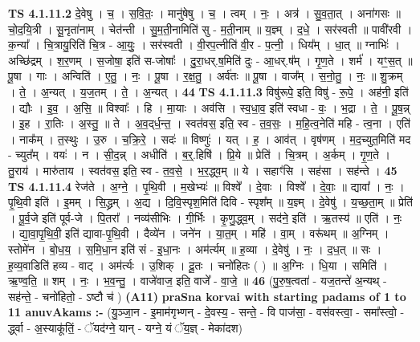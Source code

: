 \documentclass[17pt]{extarticle}
\begin{document}
                  \newline
                                \textbf{ TS 4.1.11.2} \newline
                  दे॒वेषु । च॒ । स॒वि॒तः॒ । मानु॑षेषु । च॒ । त्वम् । नः॒ । अत्र॑ । सु॒व॒ता॒त् । अना॑गसः ॥ चो॒द॒यि॒त्री । सू॒नृता॑नाम् । चेत॑न्ती । सु॒म॒ती॒नामिति॑ सु - म॒ती॒नाम् ॥ य॒ज्ञ्म् । द॒धे॒ । सर॑स्वती ॥ पावी॑रवी । क॒न्या᳚ । चि॒त्रायु॒रिति॑ चि॒त्र - आ॒युः॒ । सर॑स्वती । वी॒रप॒त्नीति॑ वी॒र - प॒त्नी॒ । धिय᳚म् । धा॒त् ॥ ग्नाभिः॑ । अच्छि॑द्रम् । श॒र॒णम् । स॒जोषा॒ इति॑ स-जोषाः᳚ । दु॒रा॒धर्.ष॒मिति॑ दुः - आ॒धर्.ष᳚म् । गृ॒ण॒ते । शर्म॑ । यꣳ॒॒स॒त् ॥ पू॒षा । गाः । अन्विति॑ । ए॒तु॒ । नः॒ । पू॒षा । र॒क्ष॒तु॒ । अर्व॑तः ॥ पू॒षा । वाज᳚म् । स॒नो॒तु॒ । नः॒ ॥ शु॒क्रम् । ते॒ । अ॒न्यत् । य॒ज॒तम् । ते॒ । अ॒न्यत् । \textbf{  44} \newline
                  \newline
                                \textbf{ TS 4.1.11.3} \newline
                  विषु॑रूपे॒ इति॒ विषु॑ - रू॒पे॒ । अह॑नी॒ इति॑ । द्यौः । इ॒व॒ । अ॒सि॒ ॥ विश्वाः᳚ । हि । मा॒याः । अव॑सि । स्व॒धा॒व॒ इति॑ स्वधा - वः॒ । भ॒द्रा । ते॒ । पू॒ष॒न्न् । इ॒ह । रा॒तिः । अ॒स्तु॒ ॥ ते । अ॒व॒द्‌र्ध॒न्त॒ । स्वत॑वस॒ इति॒ स्व - त॒व॒सः॒ । म॒हि॒त्व॒नेति॑ महि - त्व॒ना । एति॑ । नाक᳚म् । त॒स्थुः । उ॒रु । च॒क्रि॒रे॒ । सदः॑ ॥ विष्णुः॑ । यत् । ह॒ । आव॑त् । वृष॑णम् । म॒द॒च्युत॒मिति॑ मद - च्युत᳚म् । वयः॑ । न । सी॒द॒न्न् । अधीति॑ । ब॒र्॒.हिषि॑ । प्रि॒ये ॥ प्रेति॑ । चि॒त्रम् । अ॒र्कम् । गृ॒ण॒ते । तु॒राय॑ । मारु॑ताय । स्वत॑वस॒ इति॒ स्व - त॒व॒से॒ । भ॒र॒द्ध्व॒म् ॥ ये । सहाꣳ॑सि । सह॑सा । सह॑न्ते । \textbf{  45} \newline
                  \newline
                                \textbf{ TS 4.1.11.4} \newline
                  रेज॑ते । अ॒ग्ने॒ । पृ॒थि॒वी । म॒खेभ्यः॑ ॥ विश्वे᳚ । दे॒वाः । विश्वे᳚ । दे॒वाः॒ ॥ द्यावा᳚ । नः॒ । पृ॒थि॒वी इति॑ । इ॒मम् । सि॒द्ध्रम् । अ॒द्य । दि॒वि॒स्पृश॒मिति॑ दिवि - स्पृश᳚म् ॥ य॒ज्ञ्म् । दे॒वेषु॑ । य॒च्छ॒ता॒म् ॥ प्रेति॑ । पू॒र्व॒जे इति॑ पूर्व-जे । पि॒तरा᳚ । नव्य॑सीभिः । गी॒र्भिः । कृ॒णु॒द्ध्व॒म् । सद॑ने॒ इति॑ । ऋ॒तस्य॑ ॥ एति॑ । नः॒ । द्या॒वा॒पृ॒थि॒वी॒ इति॑ द्यावा-पृ॒थि॒वी । दैव्ये॑न । जने॑न । या॒त॒म् । महि॑ । वा॒म् । वरू॑थम् ॥ अ॒ग्निम् । स्तोमे॑न । बो॒ध॒य॒ । स॒मि॒धा॒न इति॑ सं - इ॒धा॒नः । अम॑र्त्यम् ॥ ह॒व्या । दे॒वेषु॑ । नः॒ । द॒ध॒त् ॥ सः । ह॒व्य॒वाडिति॑ हव्य - वाट् । अम॑र्त्यः । उ॒शिक् । दू॒तः । चनो॑हितः ( ) ॥ अ॒ग्निः । धि॒या । समिति॑ । ऋ॒ण्व॒ति॒ ॥ शम् । नः॒ । भ॒व॒न्तु॒ । वाजे॑वाज॒ इति॒ वाजे᳚ - वा॒जे॒ ॥ \textbf{  46} \newline
                  \newline
                      (पु॒रु॒ष॒त्वता॑ - यज॒तन्ते॑ अ॒न्यथ् - सह॑न्ते॒ - चनो॑हितो॒ - ऽष्टौ च॑ )  \textbf{(A11)} \newline \newline
\textbf{praSna korvai with starting padams of 1 to 11 anuvAkams :-} \newline
(यु॒ञ्जा॒न - इ॒माम॑गृभ्णन् - दे॒वस्य॒ - सन्ते॒ - वि पाज॑सा॒ - वस॑वस्त्वा॒ - समा᳚स्त्वो॒ - र्द्ध्वा - अ॒स्याकू॑तिं॒ - ॅयद॑ग्ने॒ यान् - यग्ने॒ यं ॅय॒ज्ञ् - मेका॑दश) \newline
\end{document}
